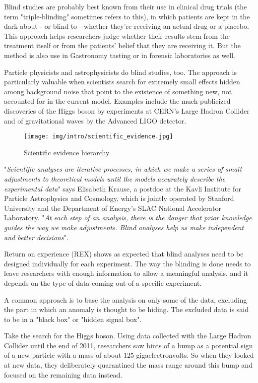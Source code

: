 	Blind studies are probably best known from their use in clinical drug trials (the term "triple-blinding" sometimes refers to this), in which patients are kept in the dark about - or blind to - whether they're receiving an actual drug or a placebo. This approach helps researchers judge whether their results stem from the treatment itself or from the patients' belief that they are receiving it. But the method is also use in Gastronomy tasting or in forensic laboratories as well.
	
	Particle physicists and astrophysicists do blind studies, too. The approach is particularly valuable when scientists search for extremely small effects hidden among background noise that point to the existence of something new, not accounted for in the current model. Examples include the much-publicized discoveries of the Higgs boson by experiments at CERN's Large Hadron Collider and of gravitational waves by the Advanced LIGO detector.
	\begin{figure}[H]
		\centering
		\texttt{[image: img/intro/scientific\_evidence.jpg]}
		\caption{Scientific evidence hierarchy}
	\end{figure}
	"\textit{Scientific analyses are iterative processes, in which we make a series of small adjustments to theoretical models until the models accurately describe the experimental data}" says Elisabeth Krause, a postdoc at the Kavli Institute for Particle Astrophysics and Cosmology, which is jointly operated by Stanford University and the Department of Energy's SLAC National Accelerator Laboratory. "\textit{At each step of an analysis, there is the danger that prior knowledge guides the way we make adjustments. Blind analyses help us make independent and better decisions}".
	
	Return on experience (REX) shows as expected that blind analyses need to be designed individually for each experiment. The way the blinding is done needs to leave researchers with enough information to allow a meaningful analysis, and it depends on the type of data coming out of a specific experiment.

	A common approach is to base the analysis on only some of the data, excluding the part in which an anomaly is thought to be hiding. The excluded data is said to be in a "black box" or "hidden signal box".

	Take the search for the Higgs boson. Using data collected with the Large Hadron Collider until the end of 2011, researchers saw hints of a bump as a potential sign of a new particle with a mass of about $125$ gigaelectronvolts. So when they looked at new data, they deliberately quarantined the mass range around this bump and focused on the remaining data instead.


